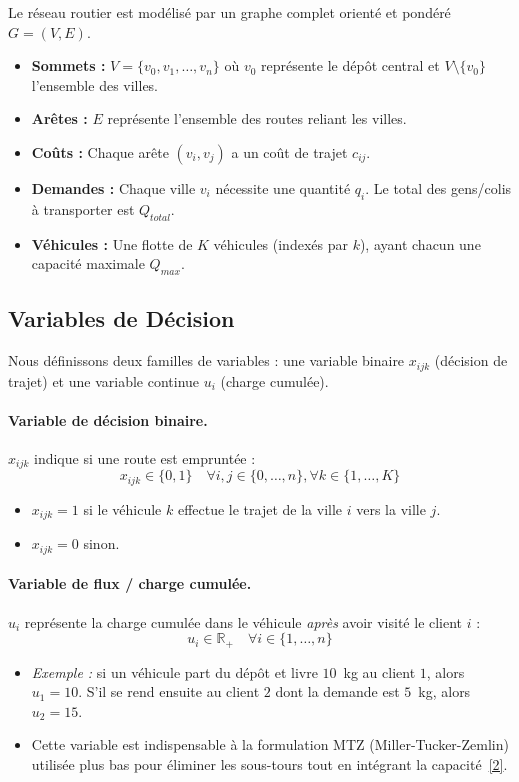 Le réseau routier est modélisé par un graphe complet orienté et pondéré $G = (V, E)$.
\begin{itemize}
    \item \textbf{Sommets :} $V = \{v_0, v_1, \dots, v_n\}$ où $v_0$ représente le dépôt central et $V \setminus \{v_0\}$ l'ensemble des villes.
    \item \textbf{Arêtes :} $E$ représente l'ensemble des routes reliant les villes.
    \item \textbf{Coûts :} Chaque arête $(v_i, v_j)$ a un coût de trajet $c_{ij}$.
    \item \textbf{Demandes :} Chaque ville $v_i$ nécessite une quantité $q_i$. Le total des gens/colis à transporter est $Q_{total}$.
    \item \textbf{Véhicules :} Une flotte de $K$ véhicules (indexés par $k$), ayant chacun une capacité maximale $Q_{max}$.
\end{itemize}

\subsection{Variables de Décision}

Nous définissons deux familles de variables : une variable binaire $x_{ijk}$ (décision de trajet) et une variable continue $u_i$ (charge cumulée).

\paragraph{Variable de décision binaire.} $x_{ijk}$ indique si une route est empruntée :
$$x_{ijk} \in \{0, 1\} \quad \forall i,j \in \{0, \dots, n\}, \forall k \in \{1, \dots, K\}$$
\begin{itemize}
    \item $x_{ijk} = 1$ si le véhicule $k$ effectue le trajet de la ville $i$ vers la ville $j$.
    \item $x_{ijk} = 0$ sinon.
\end{itemize}

\paragraph{Variable de flux / charge cumulée.} $u_i$ représente la charge cumulée dans le véhicule \textit{après} avoir visité le client $i$ :
$$u_i \in \mathbb{R}_{+} \quad \forall i \in \{1, \dots, n\}$$
\begin{itemize}
    \item \textit{Exemple :} si un véhicule part du dépôt et livre $10$~kg au client $1$, alors $u_1 = 10$. S'il se rend ensuite au client $2$ dont la demande est $5$~kg, alors $u_2 = 15$.
    \item Cette variable est indispensable à la formulation MTZ (Miller-Tucker-Zemlin) utilisée plus bas pour éliminer les sous-tours tout en intégrant la capacité~\hyperlink{ref:mtz1960}{[2]}.
\end{itemize}

